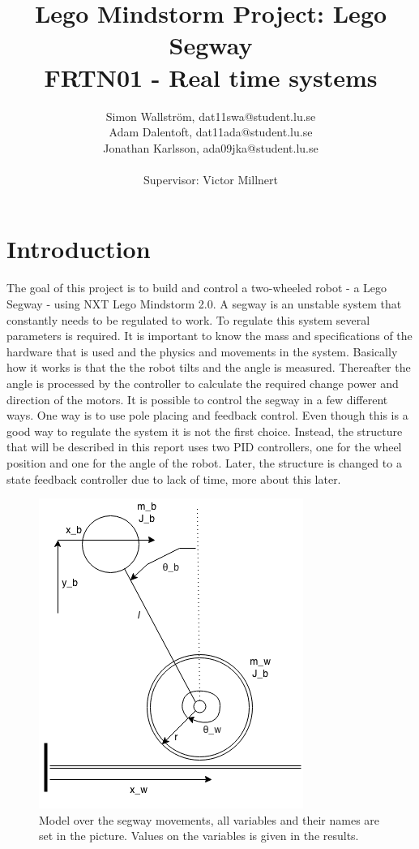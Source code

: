 \documentclass[a4paper]{article}
\title{Lego Mindstorm Project: Lego Segway\\
FRTN01 - Real time systems}
\author{Simon Wallström, dat11swa@student.lu.se\\
Adam Dalentoft, dat11ada@student.lu.se\\
Jonathan Karlsson, ada09jka@student.lu.se\\\\
Supervisor: Victor Millnert
}
\begin{document}

\maketitle
\thispagestyle{empty}
\newpage
\setcounter{page}{1}
\tableofcontents
\newpage
\section{Introduction}
The goal of this project is to build and control a two-wheeled robot - a Lego Segway - using NXT Lego Mindstorm 2.0. A segway is an unstable system that constantly needs to be regulated to work. To regulate this system several parameters is required. It is important to know the mass and specifications of the hardware that is used and the physics and movements in the system. Basically how it works is that the the robot tilts and the angle is measured. Thereafter the angle is processed by the controller to calculate the required change power and direction of the motors. It is possible to control the segway in a few different ways. One way is to use pole placing and feedback control. Even though this is a good way to regulate the system it is not the first choice. Instead, the structure that will be described in this report uses two PID controllers, one for the wheel position and one for the angle of the robot. Later, the structure is changed to a state feedback controller due to lack of time, more about this later.

\begin{figure}[H]
 \centering
\includegraphics[scale=0.8]{pic/segway.png}
\caption{Model over the segway movements, all variables and their names are set in the picture. Values on the variables is given in the results.}
\end{figure}
\end{document}
